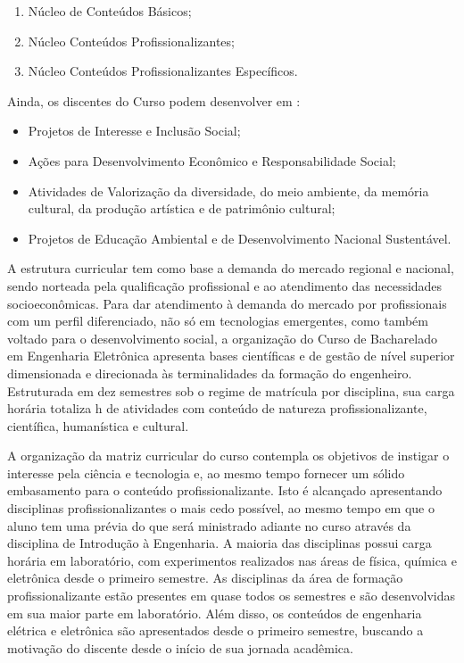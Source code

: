 \begin{enumerate}
	\item 	Núcleo de Conteúdos Básicos;
	\item 	Núcleo Conteúdos Profissionalizantes;
	\item 	Núcleo Conteúdos Profissionalizantes Específicos.
\end{enumerate}

Ainda, os discentes do Curso podem desenvolver em :

\begin{itemize}
	\item 	Projetos de Interesse e Inclusão Social;
	\item	Ações para Desenvolvimento Econômico e Responsabilidade Social;
	\item	Atividades de Valorização da diversidade, do meio ambiente, da memória cultural, da produção artística e de patrimônio cultural;
	\item	Projetos de Educação Ambiental e de Desenvolvimento Nacional Sustentável.
\end{itemize}

A estrutura curricular tem como base a demanda do mercado regional e nacional, sendo norteada pela qualificação profissional e ao atendimento das necessidades socioeconômicas. Para dar atendimento à demanda do mercado por profissionais com um perfil diferenciado, não só em tecnologias emergentes, como também voltado para o desenvolvimento social, a organização do Curso de Bacharelado em Engenharia Eletrônica apresenta bases científicas e de gestão de nível superior dimensionada e direcionada às terminalidades da formação do engenheiro. Estruturada em dez semestres sob o regime de matrícula por disciplina, sua carga horária totaliza \the\value{horasT} h de atividades com conteúdo de natureza profissionalizante, científica, humanística e cultural.

A organização da matriz curricular do curso contempla os objetivos de instigar o interesse pela ciência e tecnologia e, ao mesmo tempo fornecer um sólido embasamento para o conteúdo profissionalizante. Isto é alcançado apresentando disciplinas profissionalizantes o mais cedo possível, ao mesmo tempo em que o aluno tem uma prévia do que será ministrado adiante no curso através da disciplina de Introdução à Engenharia. A maioria das disciplinas possui carga horária em laboratório, com experimentos realizados nas áreas de física, química e eletrônica desde o primeiro semestre. As disciplinas da área de formação profissionalizante estão presentes em quase todos os semestres e são desenvolvidas em sua maior parte em laboratório. Além disso, os conteúdos de engenharia elétrica e eletrônica são apresentados desde o primeiro semestre, buscando a motivação do discente desde o início de sua jornada acadêmica.

